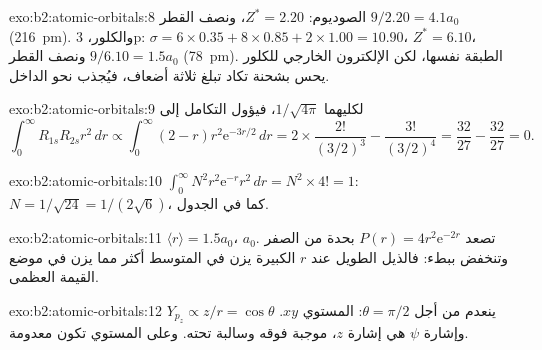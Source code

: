 \begin{solution}{exo:b2:atomic-orbitals:8}
الصوديوم: $Z^* = 2.20$، ونصف القطر $9/2.20 = 4.1a_0$ (\qty{216}{pm}). والكلور، 3p:
$\sigma = 6 \times 0.35 + 8 \times 0.85 + 2 \times 1.00 = 10.90$، $Z^* = 6.10$، ونصف القطر
$9/6.10 = 1.5a_0$ (\qty{78}{pm}). الطبقة نفسها، لكن الإلكترون الخارجي للكلور
يحس بشحنة تكاد تبلغ ثلاثة أضعاف، فيُجذب نحو الداخل.
\end{solution}

\begin{solution}{exo:b2:atomic-orbitals:9}
لكليهما  $1/\sqrt{4\pi}$، فيؤول التكامل إلى
\[
  \int_0^\infty R_{1s}R_{2s}r^2\,dr \propto \int_0^\infty (2 - r)r^2\mathrm e^{-3r/2}\,dr =
  2 \times \frac{2!}{(3/2)^3} - \frac{3!}{(3/2)^4} = \frac{32}{27} - \frac{32}{27} = 0 .
\]
\end{solution}

\begin{solution}{exo:b2:atomic-orbitals:10}
$\int_0^\infty N^2r^2\mathrm e^{-r}r^2\,dr = N^2 \times 4! = 1$: $N = 1/\sqrt{24} =
1/(2\sqrt6)$، كما في الجدول.
\end{solution}

\begin{solution}{exo:b2:atomic-orbitals:11}
$\langle r\rangle = 1.5a_0$،  $a_0$. تصعد $P(r) = 4r^2\mathrm e^{-2r}$
بحدة من الصفر وتنخفض ببطء: فالذيل الطويل عند $r$ الكبيرة يزن في
المتوسط أكثر مما يزن في موضع القيمة العظمى.
\end{solution}

\begin{solution}{exo:b2:atomic-orbitals:12}
$Y_{p_z} \propto z/r = \cos\theta$ ينعدم من أجل $\theta = \pi/2$: المستوي $xy$.
وإشارة $\psi$ هي إشارة $z$، موجبة فوقه وسالبة تحته. وعلى المستوي تكون
 معدومة.
\end{solution}

